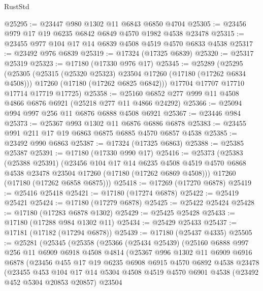 \begin{lexlean}{RustStd}
\begin{coremodule}
{\begin{coremodule}
{{{{{{{{{{{{{{{{{{{{{{{{{{{{{{{{{{{{{{{{{{{{{{{{{{{{{{{@25295 := @23447 @980 @1302 @11 @6843 @6850 @4704
@25305 := @23456 @979 @17 @19 @6235 @6842 @6849 @4570 @1982 @4538 @23478
@25315 := @23455 @977 @104 @17 @14 @6839 @4508 @4519 @4570 @6833 @4538
@25317 := @23492 @976 @6839
@25319 := @17324 (@17325 @6839)
@25320 := @25317 @25319
@25323 := @17180 (@17330 @976 @17)
@25345 := @25289
    (@25295
      (@25305
        (@25315 (@25320 @25323) @23504 @17260 (@17180 (@17262 @6834 @4508)))
        @17260
        (@17180 (@17262 @6825 @6842)))
      @17704
      @17707
      @17710
      @17714
      @17719
      @17725)
@25358 := @25160 @6852 @277 @999 @11 @4508 @4866 @6876 @6921 (@25218 @277 @11 @4866 @24292)
@25366 := @25094 @994 @997 @256 @11 @6876 @6888 @4508 @6921
@25367 := @23446 @984
@25373 := @25367 @993 @1302 @11 @6876 @6886 @6878
@25383 := @23455 @991 @211 @17 @19 @6863 @6875 @6885 @4570 @6857 @4538
@25385 := @23492 @990 @6863
@25387 := @17324 (@17325 @6863)
@25388 := @25385 @25387
@25391 := @17180 (@17330 @990 @17)
@25416 := @25373
    (@25383
      (@25388 @25391)
      (@23456
        @104
        @17
        @14
        @6235
        @4508
        @4519
        @4570
        @6868
        @4538
        @23478
        @23504
        @17260
        (@17180 (@17262 @6869 @4508)))
      @17260
      (@17180 (@17262 @6858 @6875)))
@25418 := @17269 (@17270 @6878)
@25419 := @25416 @25418
@25421 := @17180 (@17274 @6878)
@25422 := @25419 @25421
@25424 := @17180 (@17279 @6878)
@25425 := @25422 @25424
@25428 := @17180 (@17283 @6878 @1302)
@25429 := @25425 @25428
@25433 := @17180 (@17288 @984 @1302 @11)
@25434 := @25429 @25433
@25437 := @17181 (@17182 (@17294 @6878))
@25439 := @17180 (@25437 @4335)
@25505 := @25281
    (@25345
      (@25358
        (@25366
          (@25434 @25439)
          (@25160
            @6888
            @997
            @256
            @11
            @6909
            @6918
            @4508
            @4814
            (@25367
              @996
              @1302
              @11
              @6909
              @6916
              @6878
              (@23456
                @455
                @17
                @19
                @6235
                @6908
                @6915
                @4570
                @6892
                @4538
                @23478
                (@23455
                  @453
                  @104
                  @17
                  @14
                  @5304
                  @4508
                  @4519
                  @4570
                  @6901
                  @4538
                  (@23492 @452 @5304 @20853 @20857)
                  @23504
}}}}}}}}}}}}}}}}}}}}}}}}}}}}}}}}}}}}}}}}}}}}}}}}}}}}}}}
\end{coremodule}}
\end{coremodule}
\end{lexlean}
